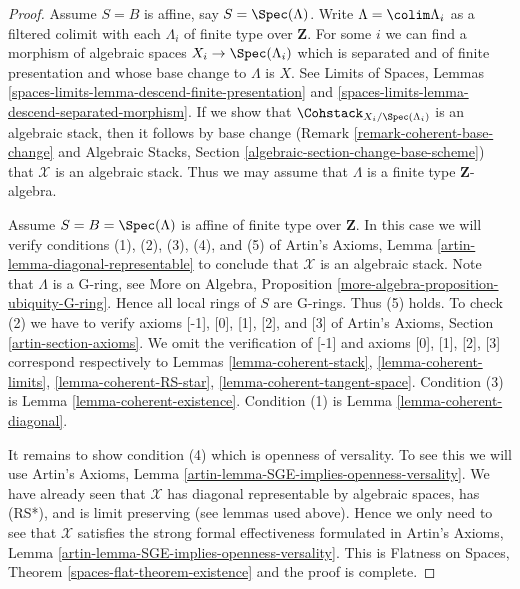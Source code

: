 \begin{proof}
\medskip\noindent
Assume $S = B$ is affine, say $S = \Spec(\Lambda)$.
Write $\Lambda = \colim \Lambda_i$ as a filtered colimit with each $\Lambda_i$
of finite type over $\mathbf{Z}$. For some $i$ we can find
a morphism of algebraic spaces $X_i \to \Spec(\Lambda_i)$
which is separated and of finite presentation and whose base change
to $\Lambda$ is $X$. See Limits of Spaces, Lemmas
\ref{spaces-limits-lemma-descend-finite-presentation} and
\ref{spaces-limits-lemma-descend-separated-morphism}.
If we show that $\Cohstack_{X_i/\Spec(\Lambda_i)}$ is an
algebraic stack, then it follows by base change
(Remark \ref{remark-coherent-base-change} and
Algebraic Stacks, Section \ref{algebraic-section-change-base-scheme})
that $\mathcal{X}$ is an algebraic stack.
Thus we may assume that $\Lambda$ is a finite type $\mathbf{Z}$-algebra.

\medskip\noindent
Assume $S = B = \Spec(\Lambda)$ is affine of finite type over $\mathbf{Z}$.
In this case we will verify conditions (1), (2), (3), (4), and (5) of
Artin's Axioms, Lemma \ref{artin-lemma-diagonal-representable}
to conclude that $\mathcal{X}$ is an algebraic stack.
Note that $\Lambda$ is a G-ring, see
More on Algebra, Proposition \ref{more-algebra-proposition-ubiquity-G-ring}.
Hence all local rings of $S$ are G-rings. Thus (5) holds.
To check (2) we have to verify axioms [-1], [0], [1], [2], and [3]
of Artin's Axioms, Section \ref{artin-section-axioms}.
We omit the verification of [-1] and axioms
[0], [1], [2], [3] correspond respectively to
Lemmas \ref{lemma-coherent-stack},
\ref{lemma-coherent-limits},
\ref{lemma-coherent-RS-star},
\ref{lemma-coherent-tangent-space}.
Condition (3) is Lemma \ref{lemma-coherent-existence}.
Condition (1) is Lemma \ref{lemma-coherent-diagonal}.

\medskip\noindent
It remains to show condition (4) which is openness of versality.
To see this we will use
Artin's Axioms, Lemma \ref{artin-lemma-SGE-implies-openness-versality}.
We have already seen that $\mathcal{X}$ has diagonal
representable by algebraic spaces, has (RS*), and is limit preserving
(see lemmas used above).
Hence we only need to see that $\mathcal{X}$ satisfies the strong
formal effectiveness formulated in
Artin's Axioms, Lemma \ref{artin-lemma-SGE-implies-openness-versality}.
This is Flatness on Spaces, Theorem \ref{spaces-flat-theorem-existence}
and the proof is complete.
\end{proof}
